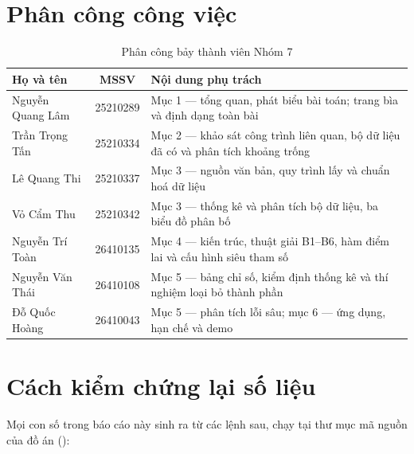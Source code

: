\clearpage
\appendix
\renewcommand{\thesection}{\Alph{section}}
\titleformat{\section}{\normalfont\Large\bfseries}{Phụ lục \thesection.}{0.6em}{}

\section{Phân công công việc}

\begin{table}[H]
\centering
\caption{Phân công bảy thành viên Nhóm 7}
\label{tab:phan-cong}
\renewcommand{\arraystretch}{1.25}
\begin{tabularx}{\textwidth}{@{}l c L@{}}
\toprule
\textbf{Họ và tên} & \textbf{MSSV} & \textbf{Nội dung phụ trách} \\
\midrule
Nguyễn Quang Lâm & 25210289 & Mục 1 --- tổng quan, phát biểu bài toán; trang bìa và định dạng toàn bài \\
Trần Trọng Tấn   & 25210334 & Mục 2 --- khảo sát công trình liên quan, bộ dữ liệu đã có và phân tích khoảng trống \\
Lê Quang Thi     & 25210337 & Mục 3 --- nguồn văn bản, quy trình lấy và chuẩn hoá dữ liệu \\
Vỏ Cẩm Thu       & 25210342 & Mục 3 --- thống kê và phân tích bộ dữ liệu, ba biểu đồ phân bố \\
Nguyễn Trí Toàn  & 26410135 & Mục 4 --- kiến trúc, thuật giải B1--B6, hàm điểm lai và cấu hình siêu tham số \\
Nguyễn Văn Thái  & 26410108 & Mục 5 --- bảng chỉ số, kiểm định thống kê và thí nghiệm loại bỏ thành phần \\
Đỗ Quốc Hoàng    & 26410043 & Mục 5 --- phân tích lỗi sâu; mục 6 --- ứng dụng, hạn chế và demo \\
\bottomrule
\end{tabularx}
\end{table}

\section{Cách kiểm chứng lại số liệu}

Mọi con số trong báo cáo này sinh ra từ các lệnh sau, chạy tại thư mục mã nguồn của đồ án
():

